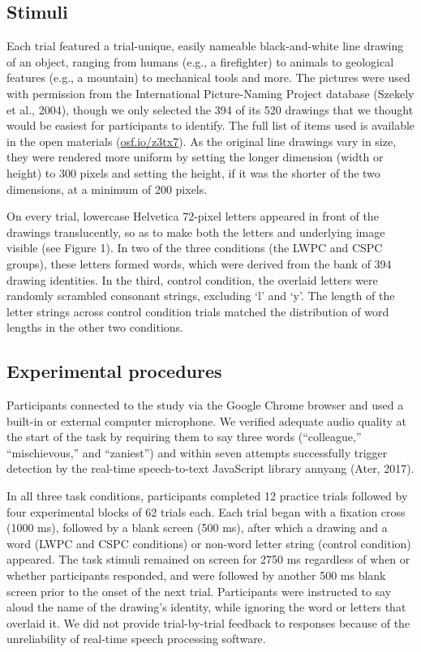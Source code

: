 \documentclass[
  ,man,floatsintext]{apa6}
\begin{document}
\hypertarget{stimuli}{%
\subsection{Stimuli}\label{stimuli}}

Each trial featured a trial-unique, easily nameable black-and-white line drawing of an object, ranging from humans (e.g., a firefighter) to animals to geological features (e.g., a mountain) to mechanical tools and more. The pictures were used with permission from the International Picture-Naming Project database (Szekely et al., 2004), though we only selected the 394 of its 520 drawings that we thought would be easiest for participants to identify. The full list of items used is available in the open materials (\href{https://osf.io/z3tx7}{osf.io/z3tx7}). As the original line drawings vary in size, they were rendered more uniform by setting the longer dimension (width or height) to 300 pixels and setting the height, if it was the shorter of the two dimensions, at a minimum of 200 pixels.

On every trial, lowercase Helvetica 72-pixel letters appeared in front of the drawings translucently, so as to make both the letters and underlying image visible (see Figure 1). In two of the three conditions (the LWPC and CSPC groups), these letters formed words, which were derived from the bank of 394 drawing identities. In the third, control condition, the overlaid letters were randomly scrambled consonant strings, excluding `l' and `y'. The length of the letter strings across control condition trials matched the distribution of word lengths in the other two conditions.

\hypertarget{experimental-procedures}{%
\subsection{Experimental procedures}\label{experimental-procedures}}

Participants connected to the study via the Google Chrome browser and used a built-in or external computer microphone. We verified adequate audio quality at the start of the task by requiring them to say three words (``colleague,'' ``mischievous,'' and ``zaniest'') and within seven attempts successfully trigger detection by the real-time speech-to-text JavaScript library annyang (Ater, 2017).

In all three task conditions, participants completed 12 practice trials followed by four experimental blocks of 62 trials each. Each trial began with a fixation cross (1000 ms), followed by a blank screen (500 ms), after which a drawing and a word (LWPC and CSPC conditions) or non-word letter string (control condition) appeared. The task stimuli remained on screen for 2750 ms regardless of when or whether participants responded, and were followed by another 500 ms blank screen prior to the onset of the next trial. Participants were instructed to say aloud the name of the drawing's identity, while ignoring the word or letters that overlaid it. We did not provide trial-by-trial feedback to responses because of the unreliability of real-time speech processing software.
\end{document}
